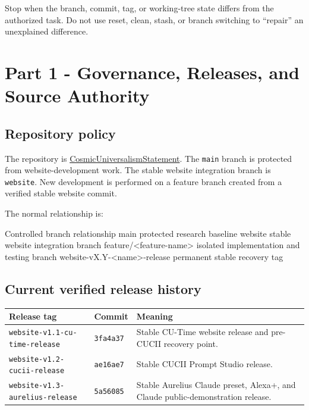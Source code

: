 \documentclass[11pt,letterpaper]{article}
\newcommand{\RepositoryName}{CosmicUniversalismStatement}
\newcommand{\RepositoryURL}{https://github.com/willmaddock/CosmicUniversalismStatement}
\newcommand{\branchname}[1]{\texttt{#1}}
\newcommand{\release}[1]{\texttt{#1}}
\begin{document}
\begin{warningbox}
Stop when the branch, commit, tag, or working-tree state differs from the
authorized task. Do not use reset, clean, stash, or branch switching to
``repair'' an unexplained difference.
\end{warningbox}

\section{Part 1 - Governance, Releases, and Source Authority}

\subsection{Repository policy}

The repository is \href{\RepositoryURL}{\RepositoryName}. The
\branchname{main} branch is protected from website-development work. The
stable website integration branch is \branchname{website}. New development is
performed on a feature branch created from a verified stable website commit.

The normal relationship is:

\begin{codebox}{Controlled branch relationship}
main                         protected research baseline
website                      stable website integration branch
feature/<feature-name>       isolated implementation and testing branch
website-vX.Y-<name>-release  permanent stable recovery tag
\end{codebox}

\subsection{Current verified release history}

\begin{tabularx}{\textwidth}{L{2.3in}L{1.0in}Y}
\toprule
\textbf{Release tag} & \textbf{Commit} & \textbf{Meaning} \\
\midrule
\release{website-v1.1-cu-time-release} & \release{3fa4a37} & Stable CU-Time website release and pre-CUCII recovery point. \\
\release{website-v1.2-cucii-release} & \release{ae16ae7} & Stable CUCII Prompt Studio release. \\
\release{website-v1.3-aurelius-release} & \release{5a56085} & Stable Aurelius Claude preset, Alexa+, and Claude public-demonstration release. \\
\bottomrule
\end{tabularx}
\end{document}
